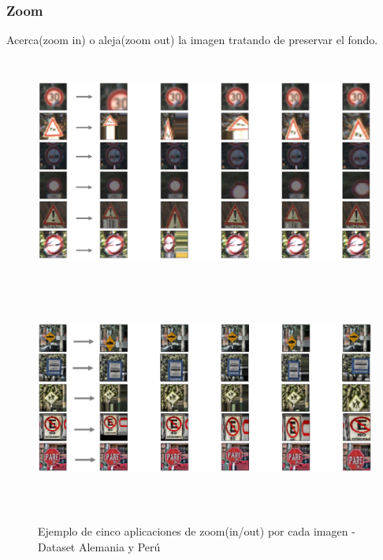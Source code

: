 		\newpage
	    \subsubsection{Zoom}
	    	Acerca(zoom in) o aleja(zoom out) la imagen  tratando de preservar el fondo.


			\begin{figure}[H]
				\begin{center}
				\includegraphics[width=1\textwidth,height=7.5cm]{images/desarrollo/Augment/zoom_inv}
				\includegraphics[width=1\textwidth,height=7.5cm]{images/desarrollo/Augment/zoom_inv2}
				\end{center}
				\begin{center}
				\vspace{0.5em}
				\caption{\small{Ejemplo de cinco aplicaciones de zoom(in/out) por cada imagen - Dataset Alemania y Perú}}
				{\small{\fontsize{10}{16.8}\selectfont {Fuente: Elaboración propia}}}
				\end{center}
				\vspace{-1.5em}
			\end{figure}


